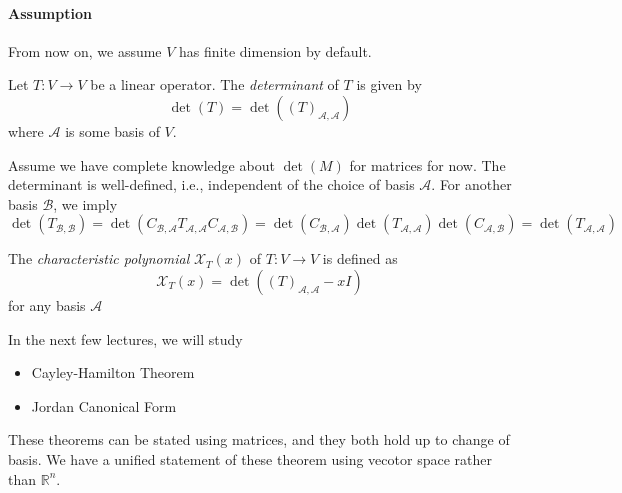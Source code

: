 \paragraph{Assumption}
From now on, we assume $V$ has finite dimension by default.

\begin{definition}[Determinant]
Let $T:V\to V$ be a linear operator.
The \emph{determinant} of $T$ is given by
\[
\det(T)=\det((T)_{\mathcal{A},\mathcal{A}})
\]
where $\mathcal{A}$ is some basis of $V$.
\end{definition}
\begin{remark}
Assume we have complete knowledge about $\det(M)$ for matrices for now.
The determinant is well-defined, i.e., independent of the choice of basis $\mathcal{A}$. For another basis $\mathcal{B}$, we imply
\[
\det(T_{\mathcal{B},\mathcal{B}})
=
\det(C_{\mathcal{B},\mathcal{A}}T_{\mathcal{A},\mathcal{A}}
C_{\mathcal{A},\mathcal{B}}
)
=
\det(C_{\mathcal{B},\mathcal{A}})
\det(T_{\mathcal{A},\mathcal{A}})
\det(C_{\mathcal{A},\mathcal{B}})=\det(T_{\mathcal{A},\mathcal{A}})
\]
\end{remark}


\begin{definition}
The \emph{characteristic polynomial} $\mathcal{X}_T(x)$
of $T:V\to V$ is defined as
\[
\mathcal{X}_T(x) = \det((T)_{\mathcal{A},\mathcal{A}} - xI)
\]
for any basis $\mathcal{A}$
\end{definition}
In the next few lectures, we will study
\begin{itemize}
\item
Cayley-Hamilton Theorem
\item
Jordan Canonical Form
\end{itemize}

These theorems can be stated using matrices, and
they both hold up to change of basis.
We have a unified statement of these theorem using vecotor space rather than $\mathbb{R}^n$.









